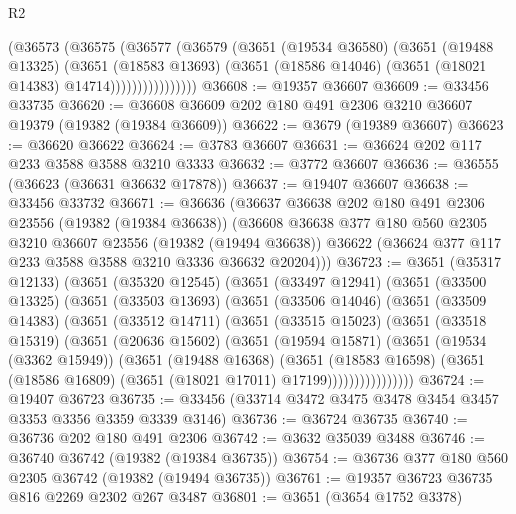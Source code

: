 \begin{lexlean}{R2}
\begin{coremodule}
                  (@36573
                    (@36575
                      (@36577
                        (@36579
                          (@3651
                            (@19534 @36580)
                            (@3651
                              (@19488 @13325)
                              (@3651
                                (@18583 @13693)
                                (@3651 (@18586 @14046) (@3651 (@18021 @14383) @14714))))))))))))))))
@36608 := @19357 @36607
@36609 := @33456 @33735
@36620 := @36608 @36609 @202 @180 @491 @2306 @3210 @36607 @19379 (@19382 (@19384 @36609))
@36622 := @3679 (@19389 @36607)
@36623 := @36620 @36622
@36624 := @3783 @36607
@36631 := @36624 @202 @117 @233 @3588 @3588 @3210 @3333
@36632 := @3772 @36607
@36636 := @36555 (@36623 (@36631 @36632 @17878))
@36637 := @19407 @36607
@36638 := @33456 @33732
@36671 := @36636
    (@36637
      @36638
      @202
      @180
      @491
      @2306
      @23556
      (@19382 (@19384 @36638))
      (@36608
        @36638
        @377
        @180
        @560
        @2305
        @3210
        @36607
        @23556
        (@19382 (@19494 @36638))
        @36622
        (@36624 @377 @117 @233 @3588 @3588 @3210 @3336 @36632 @20204)))
@36723 := @3651
    (@35317 @12133)
    (@3651
      (@35320 @12545)
      (@3651
        (@33497 @12941)
        (@3651
          (@33500 @13325)
          (@3651
            (@33503 @13693)
            (@3651
              (@33506 @14046)
              (@3651
                (@33509 @14383)
                (@3651
                  (@33512 @14711)
                  (@3651
                    (@33515 @15023)
                    (@3651
                      (@33518 @15319)
                      (@3651
                        (@20636 @15602)
                        (@3651
                          (@19594 @15871)
                          (@3651
                            (@19534 (@3362 @15949))
                            (@3651
                              (@19488 @16368)
                              (@3651
                                (@18583 @16598)
                                (@3651 (@18586 @16809) (@3651 (@18021 @17011) @17199))))))))))))))))
@36724 := @19407 @36723
@36735 := @33456 (@33714 @3472 @3475 @3478 @3454 @3457 @3353 @3356 @3359 @3339 @3146)
@36736 := @36724 @36735
@36740 := @36736 @202 @180 @491 @2306
@36742 := @3632 @35039 @3488
@36746 := @36740 @36742 (@19382 (@19384 @36735))
@36754 := @36736 @377 @180 @560 @2305 @36742 (@19382 (@19494 @36735))
@36761 := @19357 @36723 @36735 @816 @2269 @2302 @267 @3487
@36801 := @3651
    (@3654 @1752 @3378)

\end{coremodule}
\end{lexlean}
